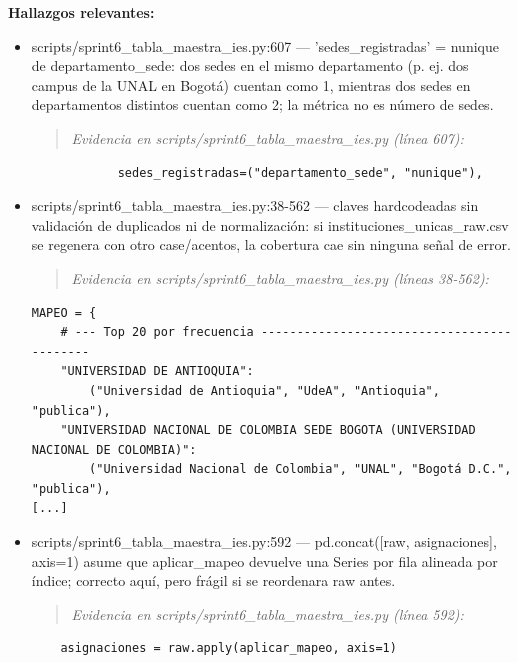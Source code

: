 \textbf{Hallazgos relevantes:}
\begin{itemize}
  \item scripts/sprint6\_tabla\_maestra\_ies.py:607 --- 'sedes\_registradas' = nunique de departamento\_sede: dos sedes en el mismo departamento (p. ej. dos campus de la UNAL en Bogotá) cuentan como 1, mientras dos sedes en departamentos distintos cuentan como 2; la métrica no es número de sedes.
\begin{quote}\footnotesize\ttfamily
\noindent\emph{Evidencia en scripts/sprint6\_tabla\_maestra\_ies.py (línea 607):}
\end{quote}
\begin{lstlisting}
            sedes_registradas=("departamento_sede", "nunique"),
\end{lstlisting}

  \item scripts/sprint6\_tabla\_maestra\_ies.py:38-562 --- claves hardcodeadas sin validación de duplicados ni de normalización: si instituciones\_unicas\_raw.csv se regenera con otro case/acentos, la cobertura cae sin ninguna señal de error.
\begin{quote}\footnotesize\ttfamily
\noindent\emph{Evidencia en scripts/sprint6\_tabla\_maestra\_ies.py (líneas 38-562):}
\end{quote}
\begin{lstlisting}
MAPEO = {
    # --- Top 20 por frecuencia -------------------------------------------
    "UNIVERSIDAD DE ANTIOQUIA":
        ("Universidad de Antioquia", "UdeA", "Antioquia", "publica"),
    "UNIVERSIDAD NACIONAL DE COLOMBIA SEDE BOGOTA (UNIVERSIDAD NACIONAL DE COLOMBIA)":
        ("Universidad Nacional de Colombia", "UNAL", "Bogotá D.C.", "publica"),
[...]
\end{lstlisting}

  \item scripts/sprint6\_tabla\_maestra\_ies.py:592 --- pd.concat([raw, asignaciones], axis=1) asume que aplicar\_mapeo devuelve una Series por fila alineada por índice; correcto aquí, pero frágil si se reordenara raw antes.
\begin{quote}\footnotesize\ttfamily
\noindent\emph{Evidencia en scripts/sprint6\_tabla\_maestra\_ies.py (línea 592):}
\end{quote}
\begin{lstlisting}
    asignaciones = raw.apply(aplicar_mapeo, axis=1)
\end{lstlisting}


\end{itemize}
